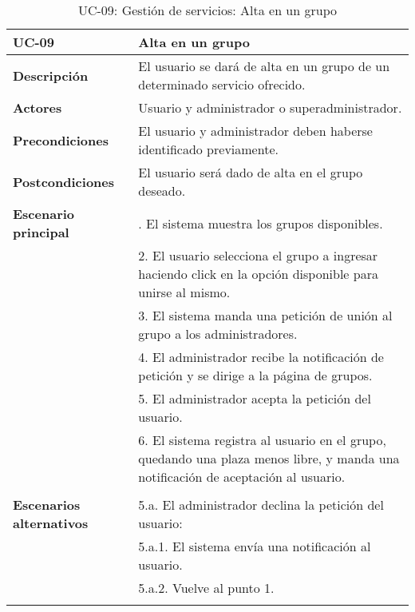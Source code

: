 \begin{table}[H]
  \begin{center}
    \begin{tabularx}{16.4cm}{|l|X|}
      \hline
      \textbf{UC-09} & \textbf{Alta en un grupo}\\
      \hline
      \textbf{Descripción} & El usuario se dará de alta en un grupo de un determinado servicio ofrecido.\\
      \hline
      \textbf{Actores} & Usuario y administrador o superadministrador.\\
      \hline
      \textbf{Precondiciones} & El usuario y administrador deben haberse identificado previamente.\\
      \hline
      \textbf{Postcondiciones} & El usuario será dado de alta en el grupo deseado.\\
      \hline
      \textbf{Escenario principal} & \smallskip 1. El sistema muestra los grupos disponibles.\\
      & 2. El usuario selecciona el grupo a ingresar haciendo click en la opción disponible para unirse al mismo. \\
      & 3. El sistema manda una petición de unión al grupo a los administradores.\\
      & 4. El administrador recibe la notificación de petición y se dirige a la página de grupos.\\
      & 5. El administrador acepta la petición del usuario.\\
      & 6. El sistema registra al usuario en el grupo, quedando una plaza menos libre, y manda una notificación de aceptación al usuario.\\
      & \\
      \hline
      \textbf{Escenarios alternativos} & \smallskip 5.a. El administrador declina la petición del usuario:\\
      & \hspace{0.3cm} 5.a.1. El sistema envía una notificación al usuario.\\
      & \hspace{0.3cm} 5.a.2. Vuelve al punto 1.\\
      & \\
      \hline
    \end{tabularx}
    \caption{UC-09: Gestión de servicios: Alta en un grupo}
  \end{center}
\end{table}


